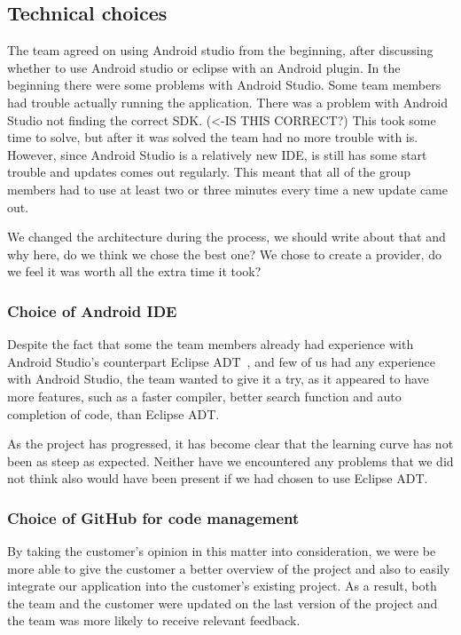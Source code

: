 \subsection{Technical choices}
The team agreed on using Android studio from the beginning, after discussing whether to use Android studio or eclipse with an Android plugin. In the beginning there were some problems with Android Studio. Some team members had trouble actually running the application. There was a problem with Android Studio not finding the correct SDK. (<-IS THIS CORRECT?) This took some time to solve, but after it was solved the team had no more trouble with is. However, since Android Studio is a relatively new IDE, is still has some start trouble and updates comes out regularly. This meant that all of the group members had to use at least two or three minutes every time a new update came out. 

We changed the architecture during the process, we should write about that and why here, do we think we chose the best one? We chose to create a provider, do we feel it was worth all the extra time it took? 

\subsubsection{Choice of Android IDE}
Despite the fact that some the team members already had experience with Android Studio's counterpart Eclipse ADT~\cite{eclipseadt}, and few of us had any experience with Android Studio, the team wanted to give it a try, as it appeared to have more features, such as a faster compiler, better search function and auto completion of code, than Eclipse ADT. 

As the project has progressed, it has become clear that the learning curve has not been as steep as expected. Neither have we encountered any problems that we did not think also would have been present if we had chosen to use Eclipse ADT.

\subsubsection{Choice of GitHub for code management}
By taking the customer's opinion in this matter into consideration, we were be more able to give the customer a better overview of the project and also to easily integrate our application into the customer's existing project. As a result, both the team and the customer were updated on the last version of the project and the team was more likely to receive relevant feedback. 

